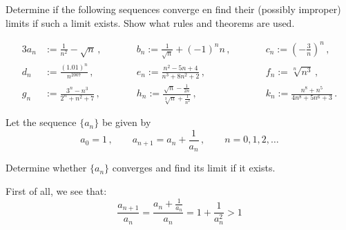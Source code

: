 \documentclass[week=3]{homework}
\begin{document}
\begin{questions}
    
	    \question
	    Determine if the following sequences converge en find their (possibly improper) limits if such a limit exists. Show what rules and theorems are used.
	    
	    \begin{alignat*}{3}
	    a_n &:= \frac{1}{n^2} - \sqrt n\,,  \qquad &&b_n := \frac{1}{\sqrt n } + (-1)^nn\,,\qquad &&c_n := \left(-\frac{3}{n}\right)^n\,, \\
	    d_n &:= \frac{(1.01)^n}{n^{2007}}\,, \qquad &&e_n := \frac{n^2-5n+4}{n^3+8n^2+2}\,, \qquad &&f_n := \sqrt[n]{n^3}\,, \\
	    g_n &:= \frac{3^n - n^3}{2^n + n^2 + 7}\,, \qquad &&h_n := \frac{\sqrt n - \frac{1}{2n}}{\sqrt[3]{n} + \frac{1}{n^2}}\,, \qquad &&k_n := \frac{n^8 + n^5}{4n^8 + 5n^6 + 3}\,.
	    \end{alignat*}
	    \begin{parts}
	    	\part
	    	
	    	\part
	    	
	    \end{parts}
    
	    \question Let the sequence $\{a_n\}$ be given by
	    \[
		    a_0 = 1\,, \qquad a_{n+1} = a_n + \frac{1}{a_n}\,, \qquad n = 0,1,2,\ldots
	    \]
	    
	    Determine whether $\{a_n\}$ converges and find its limit if it exists.
	    
	    First of all, we see that:
	    \[
		    \frac{a_{n+1}}{a_n} = \frac{a_n + \frac{1}{a_n}}{a_n} = 1 + \frac{1}{a_n^2} > 1
	    \]
	    

\end{questions}
\end{document}
